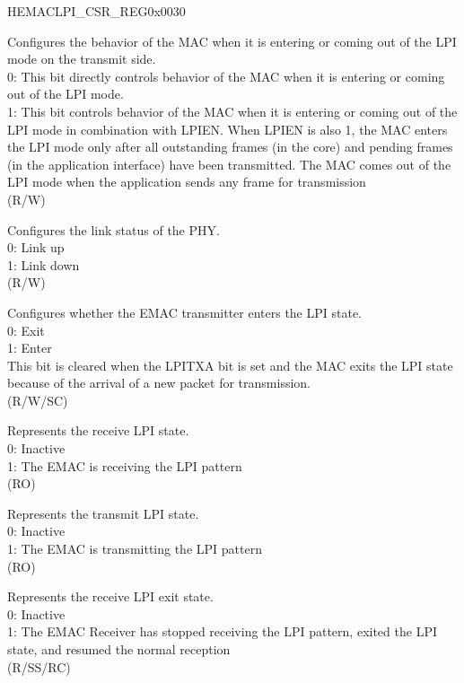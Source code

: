 \begin{register}{H}{EMACLPI\_CSR\_REG}{0x0030}\label{regdesc:EMACLPICSRREG}
%
%
%
%
%
%
%
%
%
%
%
%
%
\regnewline%
\begin{regdesc}\begin{reglist}
\item [LPITXA] Configures the behavior of the MAC when it is entering or coming out of the LPI mode on the transmit side.\\
0: This bit directly controls behavior of the MAC when it is entering or coming out of the LPI mode.\\
1: This bit controls behavior of the MAC when it is entering or coming out of the LPI mode in combination with LPIEN. When LPIEN is also 1, the MAC enters the LPI mode only after all outstanding frames (in the core) and pending frames (in the application interface) have been transmitted. The MAC comes out of the LPI mode when the application sends any frame for transmission\\(R/W)
\item [PLS] Configures the link status of the PHY.\\
0: Link up\\
1:  Link down\\ (R/W)
\item [LPIEN] Configures whether the EMAC transmitter enters the LPI state.\\
0: Exit\\
1: Enter\\
This bit is cleared when the LPITXA bit is set and the MAC exits the LPI state because of the arrival of a new packet for transmission.\\ (R/W/SC)
\item [RLPIST] Represents the receive LPI state.\\
0: Inactive\\
1: The EMAC is receiving the LPI pattern\\ (RO)
\item [TLPIST] Represents the transmit LPI state.\\
0: Inactive\\
1: The EMAC is transmitting the LPI pattern\\ (RO)
\item [RLPIEX] Represents the receive LPI exit state.\\
0: Inactive\\
1: The EMAC Receiver has stopped receiving the LPI pattern, exited the LPI state, and resumed the normal reception\\ (R/SS/RC)

\item[Continued on the next page...]
\end{reglist}\end{regdesc}
\end{register}
